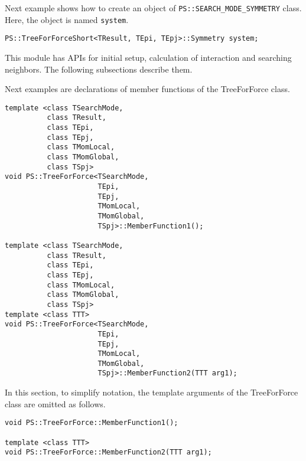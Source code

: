 Next example shows how to create an object of {\tt PS::SEARCH\_MODE\_SYMMETRY} class.  Here, the object is named {\tt system}.

\begin{screen}
\begin{verbatim}
PS::TreeForForceShort<TResult, TEpi, TEpj>::Symmetry system;
\end{verbatim}
\end{screen}


This module has APIs for initial setup, calculation of interaction and searching neighbors. The following subsections describe them.

Next examples are declarations of member functions of the TreeForForce class.

\begin{screen}
\begin{verbatim}
template <class TSearchMode,
          class TResult,
          class TEpi,
          class TEpj,
          class TMomLocal,
          class TMomGlobal,
          class TSpj>
void PS::TreeForForce<TSearchMode,
                      TEpi,
                      TEpj,
                      TMomLocal,
                      TMomGlobal,
                      TSpj>::MemberFunction1();

template <class TSearchMode,
          class TResult,
          class TEpi,
          class TEpj,
          class TMomLocal,
          class TMomGlobal,
          class TSpj>
template <class TTT>
void PS::TreeForForce<TSearchMode,
                      TEpi,
                      TEpj,
                      TMomLocal,
                      TMomGlobal,
                      TSpj>::MemberFunction2(TTT arg1);
\end{verbatim}
\end{screen}

In this section, to simplify notation, the template arguments of the
TreeForForce class are omitted as follows.

\begin{screen}
\begin{verbatim}
void PS::TreeForForce::MemberFunction1();

template <class TTT>
void PS::TreeForForce::MemberFunction2(TTT arg1);
\end{verbatim}
\end{screen}

\label{sec:treeForForceInitializeAPI}

